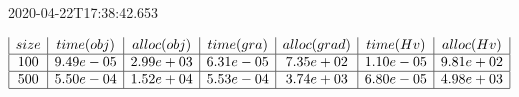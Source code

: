 

2020-04-22T17:38:42.653

\begin{equation} 
	\begin{array}{|c|c|c|c|c|c|c|}
		size         & time(obj)    & alloc(obj)   & time(gra)    & alloc(grad)  & time(Hv)     & alloc(Hv)    \\ \hline 
		100          & 9.49e-05     & 2.99e+03     & 6.31e-05     & 7.35e+02     & 1.10e-05     & 9.81e+02    \\ \hline 
		500          & 5.50e-04     & 1.52e+04     & 5.53e-04     & 3.74e+03     & 6.80e-05     & 4.98e+03    \\ \hline 
	\end{array} 
\end{equation}
